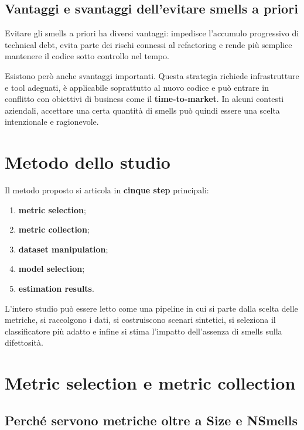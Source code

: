 \subsection{Vantaggi e svantaggi dell'evitare smells a priori}

Evitare gli smells a priori ha diversi vantaggi: impedisce l'accumulo progressivo di technical debt, evita parte dei rischi connessi al refactoring e rende più semplice mantenere il codice sotto controllo nel tempo.

Esistono però anche svantaggi importanti. Questa strategia richiede infrastrutture e tool adeguati, è applicabile soprattutto al nuovo codice e può entrare in conflitto con obiettivi di business come il \textbf{time-to-market}. In alcuni contesti aziendali, accettare una certa quantità di smells può quindi essere una scelta intenzionale e ragionevole.

\section{Metodo dello studio}

Il metodo proposto si articola in \textbf{cinque step} principali:

\begin{enumerate}
    \item \textbf{metric selection};
    \item \textbf{metric collection};
    \item \textbf{dataset manipulation};
    \item \textbf{model selection};
    \item \textbf{estimation results}.
\end{enumerate}

L'intero studio può essere letto come una pipeline in cui si parte dalla scelta delle metriche, si raccolgono i dati, si costruiscono scenari sintetici, si seleziona il classificatore più adatto e infine si stima l'impatto dell'assenza di smells sulla difettosità.

\section{Metric selection e metric collection}

\subsection{Perché servono metriche oltre a Size e NSmells}

